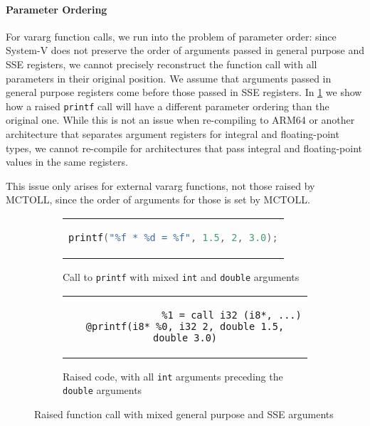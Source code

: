 \paragraph{Parameter Ordering}
For vararg function calls, we run into the problem of parameter order: since System-V does not preserve the order of arguments passed in general purpose and SSE registers, we cannot precisely reconstruct the function call with all parameters in their original position.
We assume that arguments passed in general purpose registers come before those passed in SSE registers.
In \cref{fig:raised-vararg-call} we show how a raised \texttt{printf} call will have a different parameter ordering than the original one.
While this is not an issue when re-compiling to ARM64 or another architecture that separates argument registers for integral and floating-point types, we cannot re-compile for architectures that pass integral and floating-point values in the same registers.

This issue only arises for external vararg functions, not those raised by MCTOLL, since the order of arguments for those is set by MCTOLL.

\begin{figure}[htpb]
    \centering
    \begin{subfigure}{\textwidth}
        \begin{tabular}{c}
            \begin{lstlisting}[language=C]
                printf("%f * %d = %f", 1.5, 2, 3.0);
            \end{lstlisting}
        \end{tabular}
        \caption{Call to \texttt{printf} with mixed \texttt{int} and \texttt{double} arguments}
    \end{subfigure}
    \begin{subfigure}{\textwidth}
        \begin{tabular}{c}
            \begin{lstlisting}
                %1 = call i32 (i8*, ...) @printf(i8* %0, i32 2, double 1.5, double 3.0)
            \end{lstlisting}
        \end{tabular}
        \caption{Raised code, with all \texttt{int} arguments preceding the \texttt{double} arguments}
    \end{subfigure}
    \caption{Raised function call with mixed general purpose and SSE arguments}
    \label{fig:raised-vararg-call}
\end{figure}

